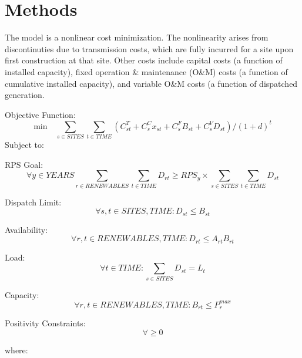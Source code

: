 \documentclass[12pt,letterpaper,fleqn]{report}
\begin{document}
\section{Methods}

The model is a nonlinear cost minimization. The nonlinearity arises
from discontinuties due to transmission costs, which are fully
incurred for a site upon first construction at that site. Other costs
include capital costs (a function of installed capacity), fixed
operation \& maintenance (O\&M) costs (a function of cumulative
installed capacity), and variable O\&M costs (a function of dispatched
generation. 

Objective Function:
  \[\text{min} \quad  \sum_{s \in SITES}\sum_{t \in TIME}(C_{st}^T + C_s^Cx_{st}
  + C_s^FB_{st} + C_s^VD_{st}) / (1 + d)^t\]
  Subject to:

  RPS Goal:
  \[\forall y \in YEARS \sum_{r \in RENEWABLES}\sum_{t \in TIME} D_{rt} \ge RPS_y \times
  \sum_{s \in SITES}\sum_{t \in TIME} D_{st}\]

  Dispatch Limit:
  \[\forall s,t \in SITES, TIME: D_{st} \le B_{st}\]

  Availability:
  \[\forall r,t \in RENEWABLES, TIME: D_{rt} \le A_{rt}B_{rt}\]

  Load:
  \[\forall t \in TIME: \sum_{s \in SITES} D_{st} = L_{t}\]

  Capacity:
  \[\forall r,t \in RENEWABLES, TIME: B_{rt} \le P_r^{max}\]

  Positivity Constraints:
  \[\forall  \ge 0\]
  
  where:
\end{document}
